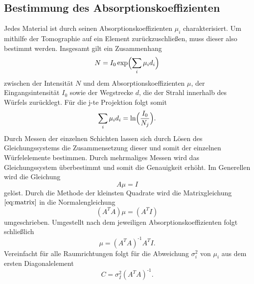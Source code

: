 \subsection{Bestimmung des Absorptionskoeffizienten}
Jedes Material ist durch seinen Absorptionskoeffizienten $\mu_i$ charakterisiert.
Um mithilfe der Tomographie auf ein Element zurückzuschließen, muss dieser also bestimmt werden.
Insgesamt gilt ein Zusammenhang
\begin{equation}
  N=I_0 \exp \Bigl(\sum_{i}\mu_i d_i\Bigr)
\end{equation}
zwischen der Intensität $N$ und dem Absorptionskoeffizienten $\mu$, der Eingangsintensität $I_0$ sowie der Wegstrecke $d$, die der Strahl innerhalb des Würfels zurücklegt.
Für die j-te Projektion folgt somit
\begin{equation}
  \sum_{i}\mu_i d_i =\ln \Bigl(\frac{I_0}{N_j}\Bigr).
\end{equation}
Durch Messen der einzelnen Schichten lassen sich durch Lösen des Gleichungssystems die Zusammensetzung dieser und somit der einzelnen Würfelelemente bestimmen.
Durch mehrmaliges Messen wird das Gleichungssystem überbestimmt und somit die Genauigkeit erhöht.
Im Generellen wird die Gleichung
\begin{equation}
  A \mu = I
  \label{eq:matrix}
\end{equation}
gelöst.
Durch die Methode der kleinsten Quadrate wird die Matrixgleichung $\ref{eq:matrix}$ in die Normalengleichung
\begin{equation}
  (A^TA)\mu = (A^T I)
\end{equation}
umgeschrieben.
Umgestellt nach dem jeweiligen Absorptionskoeffizienten folgt schließlich
\begin{equation}
  \mu = (A^T A)^\text{-1}A^TI.
\end{equation}
Vereinfacht für alle Raumrichtungen folgt für die Abweichung $\sigma_i^2$ von $\mu_i$ aus dem ersten Diagonalelement
\begin{equation}
  C=\sigma_I^2(A^TA)^\text{-1}.
\end{equation}

